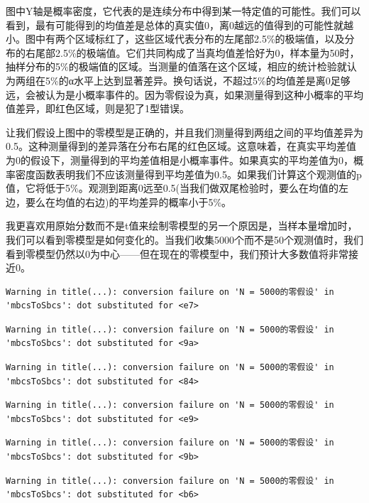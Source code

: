 \documentclass[
  letterpaper,
  DIV=11,
  numbers=noendperiod]{scrreprt}
\begin{document}
图中Y轴是概率密度，它代表的是连续分布中得到某一特定值的可能性。我们可以看到，最有可能得到的均值差是总体的真实值0，离0越远的值得到的可能性就越小。图中有两个区域标红了，这些区域代表分布的左尾部2.5\%的极端值，以及分布的右尾部2.5\%的极端值。它们共同构成了当真均值差恰好为0，样本量为50时，抽样分布的5\%的极端值的区域。当测量的值落在这个区域，相应的统计检验就认为两组在5\%的α水平上达到显著差异。换句话说，不超过5\%的均值差是离0足够远，会被认为是小概率事件的。因为零假设为真，如果测量得到这种小概率的平均值差异，即红色区域，则是犯了1型错误。

让我们假设上图中的零模型是正确的，并且我们测量得到两组之间的平均值差异为0.5。这种测量得到的差异落在分布右尾的红色区域。这意味着，在真实平均差值为0的假设下，测量得到的平均差值相是小概率事件。如果真实的平均差值为0，概率密度函数表明我们不应该测量得到平均差值为0.5。如果我们计算这个观测值的p值，它将低于5\%。观测到距离0远至0.5(当我们做双尾检验时，要么在均值的左边，要么在均值的右边)的平均差异的概率小于5\%。

我更喜欢用原始分数而不是t值来绘制零模型的另一个原因是，当样本量增加时，我们可以看到零模型是如何变化的。当我们收集5000个而不是50个观测值时，我们看到零模型仍然以0为中心------但在现在的零模型中，我们预计大多数值将非常接近0。

\begin{verbatim}
Warning in title(...): conversion failure on 'N = 5000的零假设' in
'mbcsToSbcs': dot substituted for <e7>
\end{verbatim}

\begin{verbatim}
Warning in title(...): conversion failure on 'N = 5000的零假设' in
'mbcsToSbcs': dot substituted for <9a>
\end{verbatim}

\begin{verbatim}
Warning in title(...): conversion failure on 'N = 5000的零假设' in
'mbcsToSbcs': dot substituted for <84>
\end{verbatim}

\begin{verbatim}
Warning in title(...): conversion failure on 'N = 5000的零假设' in
'mbcsToSbcs': dot substituted for <e9>
\end{verbatim}

\begin{verbatim}
Warning in title(...): conversion failure on 'N = 5000的零假设' in
'mbcsToSbcs': dot substituted for <9b>
\end{verbatim}

\begin{verbatim}
Warning in title(...): conversion failure on 'N = 5000的零假设' in
'mbcsToSbcs': dot substituted for <b6>
\end{verbatim}
\end{document}
